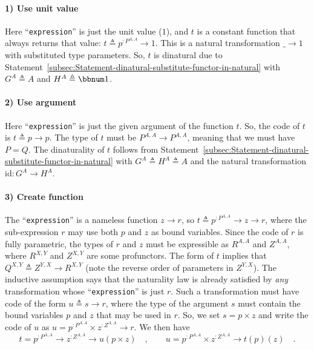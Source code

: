\paragraph{1) Use unit value}

Here \textsf{``}\lstinline!expression!\textsf{''} is just the unit value ($1$),
and $t$ is a constant function that always returns that value: $t\triangleq p^{:P^{A,A}}\rightarrow1$.
This is a natural transformation $\_\rightarrow1$ with substituted
type parameters. So, $t$ is dinatural due to Statement~\ref{subsec:Statement-dinatural-substitute-functor-in-natural}
with $G^{A}\triangleq A$ and $H^{A}\triangleq\bbnum 1$.

\paragraph{2) Use argument }

Here \textsf{``}\lstinline!expression!\textsf{''} is just the given argument of the
function $t$. So, the code of $t$ is $t\triangleq p\rightarrow p$.
The type of $t$ must be $P^{A,A}\rightarrow P^{A,A}$, meaning that
we must have $P=Q$. The dinaturality of $t$ follows from Statement~\ref{subsec:Statement-dinatural-substitute-functor-in-natural}
with $G^{A}\triangleq H^{A}\triangleq A$ and the natural transformation
$\text{id}:G^{A}\rightarrow H^{A}$.

\paragraph{3) Create function}

The \textsf{``}\lstinline!expression!\textsf{''} is a nameless function $z\rightarrow r$,
so $t\triangleq p^{:P^{A,A}}\rightarrow z\rightarrow r$, where the
sub-expression $r$ may use both $p$ and $z$ as bound variables.
Since the code of $r$ is fully parametric, the types of $r$ and
$z$ must be expressible as $R^{A,A}$ and $Z^{A,A}$, where $R^{X,Y}$
and $Z^{X,Y}$ are some profunctors. The form of $t$ implies that
$Q^{X,Y}\triangleq Z^{Y,X}\rightarrow R^{X,Y}$ (note the reverse
order of parameters in $Z^{Y,X}$). The inductive assumption says
that the naturality law is already satisfied by \emph{any} transformation
whose \textsf{``}\lstinline!expression!\textsf{''} is just $r$. Such a transformation
must have code of the form $u\triangleq s\rightarrow r$, where the
type of the argument $s$ must contain the bound variables $p$ and
$z$ that may be used in $r$. So, we set $s=p\times z$ and write
the code of $u$ as $u=p^{:P^{A,A}}\times z^{:Z^{A,A}}\rightarrow r$.
We then have
\begin{equation}
t=p^{:P^{A,A}}\rightarrow z^{:Z^{A,A}}\rightarrow u(p\times z)\quad,\quad\quad u=p^{:P^{A,A}}\times z^{:Z^{A,A}}\rightarrow t(p)(z)\quad.\label{eq:dinaturality-u-function-type-derivation0-2}
\end{equation}

